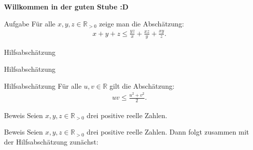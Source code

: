 \documentclass[10pt]{beamer}
\title{}
\author{Artur's Mathematikstübchen}
\date{}
\def\bR{\mathbb{R}}
\begin{document}

\begin{frame}
    \begin{center}
        \textbf{\huge Willkommen in der guten Stube \newline \newline :D}
    \end{center}
\end{frame}




\begin{frame}
    \begin{alertblock}{Aufgabe}
        Für alle \( x, y, z \in \bR_{> 0} \) zeige man die Abschätzung:
        \begin{align*}
            x + y + z
            \leq \frac{yz}{x} + \frac{xz}{y} + \frac{xy}{z}.
        \end{align*}
    \end{alertblock}
\end{frame}



\begin{frame}{Hilfsabschätzung}
    
\end{frame}



\begin{frame}{Hilfsabschätzung}
    \begin{block}{Hilfsabschätzung}
        Für alle \( u, v \in \bR \) gilt die Abschätzung:
        \begin{align*}
            uv
            \leq \frac{u^{2} + v^{2}}{2}.
        \end{align*}
    \end{block}
\end{frame}



\begin{frame}{Beweis}
    Seien \( x, y, z \in \bR_{> 0} \) drei positive reelle Zahlen.
\end{frame}



\begin{frame}{Beweis}
    Seien \( x, y, z \in \bR_{> 0} \) drei positive reelle Zahlen. Dann folgt zusammen mit der Hilfsabschätzung zunächst:
\end{frame}
\end{document}
